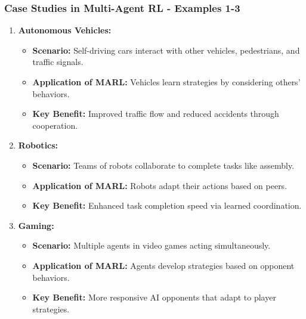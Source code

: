 \documentclass[aspectratio=169]{beamer}
\begin{document}
\begin{frame}[fragile]
    \frametitle{Case Studies in Multi-Agent RL - Examples 1-3}
    \begin{enumerate}
        \item \textbf{Autonomous Vehicles:}
        \begin{itemize}
            \item \textbf{Scenario:} Self-driving cars interact with other vehicles, pedestrians, and traffic signals.
            \item \textbf{Application of MARL:} Vehicles learn strategies by considering others' behaviors.
            \item \textbf{Key Benefit:} Improved traffic flow and reduced accidents through cooperation.
        \end{itemize}

        \item \textbf{Robotics:}
        \begin{itemize}
            \item \textbf{Scenario:} Teams of robots collaborate to complete tasks like assembly.
            \item \textbf{Application of MARL:} Robots adapt their actions based on peers.
            \item \textbf{Key Benefit:} Enhanced task completion speed via learned coordination.
        \end{itemize}

        \item \textbf{Gaming:}
        \begin{itemize}
            \item \textbf{Scenario:} Multiple agents in video games acting simultaneously.
            \item \textbf{Application of MARL:} Agents develop strategies based on opponent behaviors.
            \item \textbf{Key Benefit:} More responsive AI opponents that adapt to player strategies.
        \end{itemize}
    \end{enumerate}
\end{frame}
\end{document}
